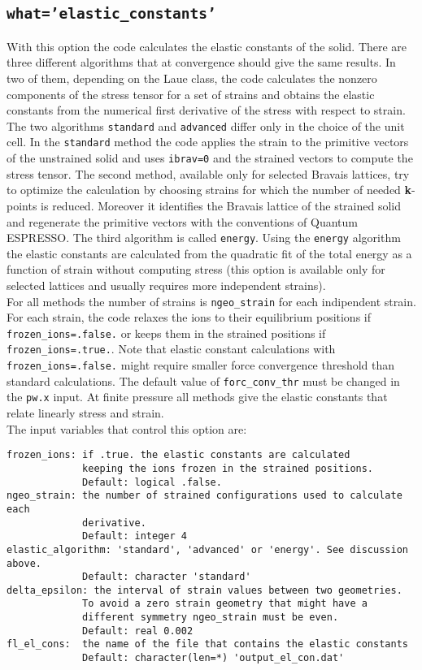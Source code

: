 \documentclass[12pt,a4paper]{article}
\def\qe{{\sc Quantum ESPRESSO}}
\begin{document}
\subsection{\texttt{what='elastic\_constants'}}
With this option the code calculates the elastic constants of the solid.
There are three different algorithms that at convergence should give the
same results. In two of them, depending on the Laue class, the code 
calculates the nonzero components of the stress tensor for a set of strains
and obtains the elastic constants from the numerical first derivative
of the stress with respect to strain.
The two algorithms \texttt{standard} and \texttt{advanced} differ
only in the choice of the unit cell. In the \texttt{standard} method the
code applies the strain to the primitive vectors of the unstrained solid
and uses \texttt{ibrav=0} and the strained vectors to compute the stress
tensor.
The second method, available only for selected Bravais lattices, try to
optimize the calculation by choosing strains for which the number
of needed {\bf k}-points is reduced. Moreover it identifies the 
Bravais lattice of the strained solid and regenerate the primitive
vectors with the conventions of \qe.
The third algorithm is called \texttt{energy}.
Using the \texttt{energy} algorithm the elastic constants are calculated 
from the quadratic fit of the total energy as a function of strain
without computing stress (this option is available only for selected 
lattices and usually requires more independent strains). \\
For all methods the number of strains is \texttt{ngeo\_strain}
for each indipendent strain. 
For each strain, the code relaxes the ions to their equilibrium 
positions if \texttt{frozen\_ions=.false.} or keeps them
in the strained positions if \texttt{frozen\_ions=.true.}. 
Note that elastic constant calculations with \texttt{frozen\_ions=.false.}
might require smaller force convergence threshold than standard calculations. 
The default value of \texttt{forc\_conv\_thr} must be changed in the 
\texttt{pw.x} input.
At finite pressure all methods give the elastic constants that
relate linearly stress and strain. \\
The input variables that control this option are:
\begin{verbatim}
frozen_ions: if .true. the elastic constants are calculated 
             keeping the ions frozen in the strained positions. 
             Default: logical .false.
ngeo_strain: the number of strained configurations used to calculate each
             derivative. 
             Default: integer 4
elastic_algorithm: 'standard', 'advanced' or 'energy'. See discussion above.
             Default: character 'standard' 
delta_epsilon: the interval of strain values between two geometries.
             To avoid a zero strain geometry that might have a
             different symmetry ngeo_strain must be even.
             Default: real 0.002
fl_el_cons:  the name of the file that contains the elastic constants
             Default: character(len=*) 'output_el_con.dat'
\end{verbatim}
\end{document}
